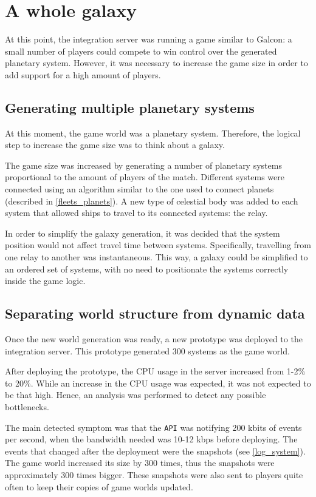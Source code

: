 \documentclass[a4paper,11pt,titlepage,abstract,numbers=noenddot,automark,mnsy,intlimits,rgb,dvipsnames]{report}
\begin{document}
\chapter{A whole galaxy}
\label{whole_galaxy}
At this point, the integration server was running a game similar to Galcon: a small number of players could
compete to win control over the generated planetary system. However, it was necessary to increase the game size
in order to add support for a high amount of players.
\section{Generating multiple planetary systems}
At this moment, the game world was a planetary system. Therefore, the logical step to increase the game size
was to think about a galaxy.

The game size was increased by generating a number of planetary systems proportional to the amount
of players of the match. Different systems were connected using an algorithm similar to the one used to
connect planets (described in \autoref{fleets_planets}). A new type of celestial body was added to each system that
allowed ships to travel to its connected systems: the relay.

In order to simplify the galaxy generation, it was decided that the system position would not affect travel time between
systems. Specifically, travelling from one relay to another was instantaneous. This way, a galaxy could be simplified
to an ordered set of systems, with no need to positionate the systems correctly inside the game logic.
\section{Separating world structure from dynamic data}
Once the new world generation was ready, a new prototype was deployed to the integration server. This prototype
generated 300 systems as the game world.

After deploying the prototype, the CPU usage in the server increased from 1-2\% to 20\%. While an increase
in the CPU usage was expected, it was not expected to be that high. Hence, an analysis was performed to detect
any possible bottlenecks.

The main detected symptom was that the \texttt{API} was notifying 200 kbits of events per second, when the bandwidth needed was 10-12 kbps
before deploying. The events that changed after the deployment were the snapshots (see \autoref{log_system}).
The game world increased its size by 300 times, thus the snapshots were approximately 300 times bigger. These snapshots
were also sent to players quite often to keep their copies of game worlds updated.
\end{document}
